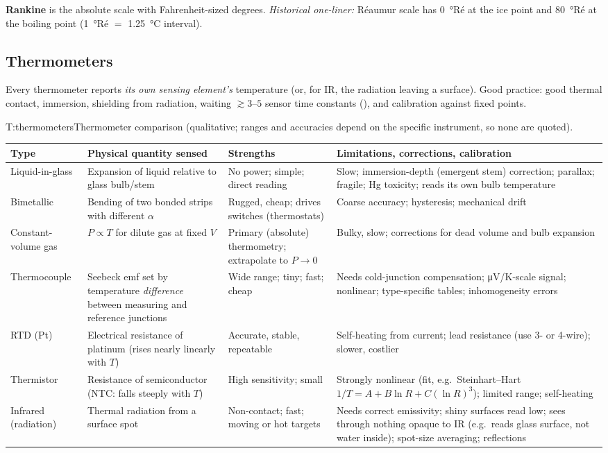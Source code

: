 \begin{multicols}{2}
\textbf{Rankine} is the absolute scale with Fahrenheit-sized degrees. \emph{Historical one-liner:} R\'eaumur scale has \SI{0}{\degree}R\'e at the ice point and \SI{80}{\degree}R\'e at the boiling point (\SI{1}{\degree}R\'e $=$ \SI{1.25}{\celsius} interval).

\subsection{Thermometers}\label{sec:thermometers}
\CORE{} Every thermometer reports \emph{its own sensing element's} temperature (or, for IR, the radiation leaving a surface). Good practice: good thermal contact, immersion, shielding from radiation, waiting $\gtrsim 3$--$5$ sensor time constants (), and calibration against fixed points.
\end{multicols}

\begin{reftab}{T:thermometers}{Thermometer comparison (qualitative; ranges and accuracies depend on the specific instrument, so none are quoted).}
\small
\begin{tabularx}{\textwidth}{@{}L{0.14\textwidth}L{0.22\textwidth}L{0.24\textwidth}Y@{}}
\toprule
Type & Physical quantity sensed & Strengths & Limitations, corrections, calibration\\
\midrule
Liquid-in-glass & Expansion of liquid relative to glass bulb/stem & No power; simple; direct reading & Slow; immersion-depth (emergent stem) correction; parallax; fragile; Hg toxicity; reads its own bulb temperature\\
Bimetallic & Bending of two bonded strips with different $\alpha$ & Rugged, cheap; drives switches (thermostats) & Coarse accuracy; hysteresis; mechanical drift\\
Constant-volume gas & $P\propto T$ for dilute gas at fixed $V$ & Primary (absolute) thermometry; extrapolate to $P\to0$ & Bulky, slow; corrections for dead volume and bulb expansion\\
Thermocouple & Seebeck emf set by temperature \emph{difference} between measuring and reference junctions & Wide range; tiny; fast; cheap & Needs cold-junction compensation; \si{\micro V/K}-scale signal; nonlinear; type-specific tables; inhomogeneity errors\\
RTD (Pt) & Electrical resistance of platinum (rises nearly linearly with $T$) & Accurate, stable, repeatable & Self-heating from current; lead resistance (use 3- or 4-wire); slower, costlier\\
Thermistor & Resistance of semiconductor (NTC: falls steeply with $T$) & High sensitivity; small & Strongly nonlinear (fit, e.g.\ Steinhart--Hart $1/T=A+B\ln R+C(\ln R)^3$); limited range; self-heating\\
Infrared (radiation) & Thermal radiation from a surface spot & Non-contact; fast; moving or hot targets & Needs correct emissivity; shiny surfaces read low; sees through nothing opaque to IR (e.g.\ reads glass surface, not water inside); spot-size averaging; reflections\\
\bottomrule
\end{tabularx}\end{reftab}

